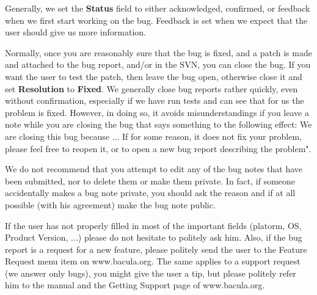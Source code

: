 Generally, we set the {\bf Status} field to either acknowledged, confirmed,
or feedback when we first start working on the bug.  Feedback is set when
we expect that the user should give us more information.

Normally, once you are reasonably sure that the bug is fixed, and a patch
is made and attached to the bug report, and/or in the SVN, you can close
the bug.  If you want the user to test the patch, then leave the bug open,
otherwise close it and set {\bf Resolution} to {\bf Fixed}.  We generally
close bug reports rather quickly, even without confirmation, especially if
we have run tests and can see that for us the problem is fixed.  However,
in doing so, it avoids misunderstandings if you leave a note while you are
closing the bug that says something to the following effect:
We are closing this bug because ...   If for some reason, it does not fix
your problem, please feel free to reopen it, or to open a new bug report
describing the problem".

We do not recommend that you attempt to edit any of the bug notes that have
been submitted, nor to delete them or make them private.  In fact, if
someone accidentally makes a bug note private, you should ask the reason
and if at all possible (with his agreement) make the bug note public.  

If the user has not properly filled in most of the important fields
(platorm, OS, Product Version, ...) please do not hesitate to politely ask
him.  Also, if the bug report is a request for a new feature, please
politely send the user to the Feature Request menu item on www.bacula.org.
The same applies to a support request (we answer only bugs), you might give
the user a tip, but please politely refer him to the manual and the
Getting Support page of www.bacula.org.
